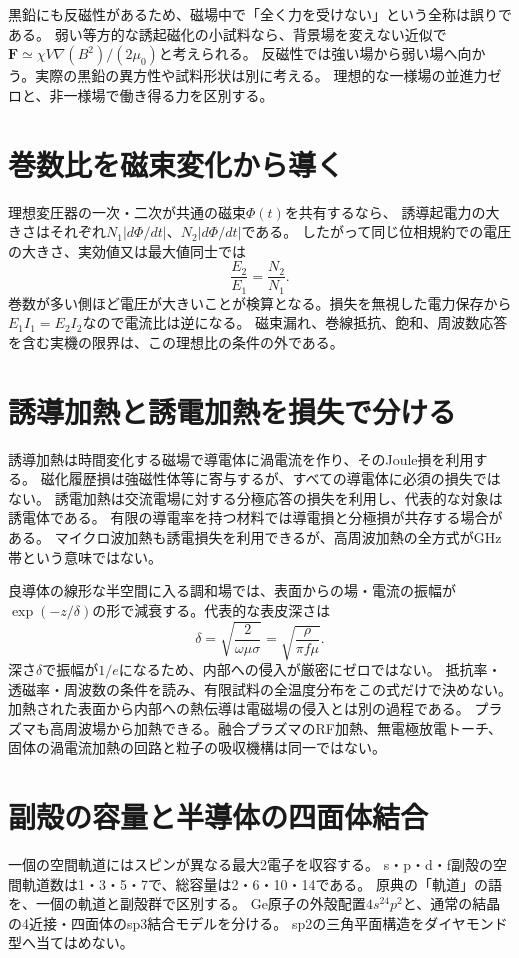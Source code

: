 黒鉛にも反磁性があるため、磁場中で「全く力を受けない」という全称は誤りである。
弱い等方的な誘起磁化の小試料なら、背景場を変えない近似で
\(\mathbf F\simeq\chi V\nabla(B^2)/(2\mu_0)\)と考えられる。
反磁性では強い場から弱い場へ向かう。実際の黒鉛の異方性や試料形状は別に考える。
理想的な一様場の並進力ゼロと、非一様場で働き得る力を区別する。

\section{巻数比を磁束変化から導く}\label{theory:em:transformer}
理想変圧器の一次・二次が共通の磁束\(\Phi(t)\)を共有するなら、
誘導起電力の大きさはそれぞれ\(N_1|d\Phi/dt|\)、\(N_2|d\Phi/dt|\)である。
したがって同じ位相規約での電圧の大きさ、実効値又は最大値同士では
\[
 \frac{E_2}{E_1}=\frac{N_2}{N_1}.
\]
巻数が多い側ほど電圧が大きいことが検算となる。損失を無視した電力保存から
\(E_1I_1=E_2I_2\)なので電流比は逆になる。
磁束漏れ、巻線抵抗、飽和、周波数応答を含む実機の限界は、この理想比の条件の外である。\cite{em51_transformer_ref}

\section{誘導加熱と誘電加熱を損失で分ける}\label{theory:em:heating}
誘導加熱は時間変化する磁場で導電体に渦電流を作り、そのJoule損を利用する。
磁化履歴損は強磁性体等に寄与するが、すべての導電体に必須の損失ではない。
誘電加熱は交流電場に対する分極応答の損失を利用し、代表的な対象は誘電体である。
有限の導電率を持つ材料では導電損と分極損が共存する場合がある。
マイクロ波加熱も誘電損失を利用できるが、高周波加熱の全方式がGHz帯という意味ではない。\cite{em51_heating}

良導体の線形な半空間に入る調和場では、表面からの場・電流の振幅が
\(\exp(-z/\delta)\)の形で減衰する。代表的な表皮深さは
\[
 \delta=\sqrt{\frac{2}{\omega\mu\sigma}}
       =\sqrt{\frac{\rho}{\pi f\mu}} .
\]
深さ\(\delta\)で振幅が\(1/e\)になるため、内部への侵入が厳密にゼロではない。
抵抗率・透磁率・周波数の条件を読み、有限試料の全温度分布をこの式だけで決めない。
加熱された表面から内部への熱伝導は電磁場の侵入とは別の過程である。\cite{em51_heating,em51_skin}
プラズマも高周波場から加熱できる。融合プラズマのRF加熱、無電極放電トーチ、
固体の渦電流加熱の回路と粒子の吸収機構は同一ではない。\cite{em51_plasma}

\section{副殻の容量と半導体の四面体結合}\label{theory:em:electrons}
一個の空間軌道にはスピンが異なる最大2電子を収容する。
s・p・d・f副殻の空間軌道数は1・3・5・7で、総容量は2・6・10・14である。
原典の「軌道」の語を、一個の軌道と副殻群で区別する。
Ge原子の外殻配置\(4s^24p^2\)と、通常の結晶の4近接・四面体のsp3結合モデルを分ける。
sp2の三角平面構造をダイヤモンド型へ当てはめない。\cite{atomic_quantum,em51_ge,em51_ge_structure}


